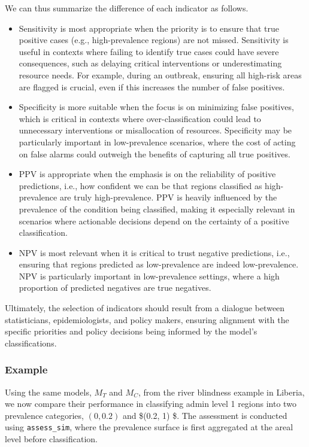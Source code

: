 \documentclass[
  letterpaper,
]{krantz}
\begin{document}
We can thus summarize the difference of each indicator as follows.

\begin{itemize}
\item
  Sensitivity is most appropriate when the priority is to ensure that
  true positive cases (e.g., high-prevalence regions) are not missed.
  Sensitivity is useful in contexts where failing to identify true cases
  could have severe consequences, such as delaying critical
  interventions or underestimating resource needs. For example, during
  an outbreak, ensuring all high-risk areas are flagged is crucial, even
  if this increases the number of false positives.
\item
  Specificity is more suitable when the focus is on minimizing false
  positives, which is critical in contexts where over-classification
  could lead to unnecessary interventions or misallocation of resources.
  Specificity may be particularly important in low-prevalence scenarios,
  where the cost of acting on false alarms could outweigh the benefits
  of capturing all true positives.
\item
  PPV is appropriate when the emphasis is on the reliability of positive
  predictions, i.e., how confident we can be that regions classified as
  high-prevalence are truly high-prevalence. PPV is heavily influenced
  by the prevalence of the condition being classified, making it
  especially relevant in scenarios where actionable decisions depend on
  the certainty of a positive classification.
\item
  NPV is most relevant when it is critical to trust negative
  predictions, i.e., ensuring that regions predicted as low-prevalence
  are indeed low-prevalence. NPV is particularly important in
  low-prevalence settings, where a high proportion of predicted
  negatives are true negatives.
\end{itemize}

Ultimately, the selection of indicators should result from a dialogue
between statisticians, epidemiologists, and policy makers, ensuring
alignment with the specific priorities and policy decisions being
informed by the model's classifications.

\subsubsection{Example}\label{example-3}

Using the same models, \(M_T\) and \(M_C\), from the river blindness
example in Liberia, we now compare their performance in classifying
admin level 1 regions into two prevalence categories, \((0, 0.2)\) and
\$(0.2, 1) \$. The assessment is conducted using \texttt{assess\_sim},
where the prevalence surface is first aggregated at the areal level
before classification.
\end{document}
